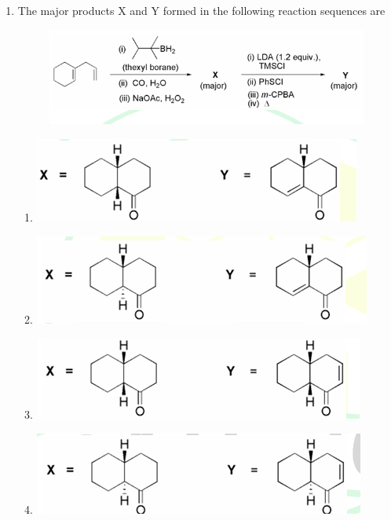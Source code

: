 \documentclass[journal,12pt,onecolumn]{IEEEtran}
\theoremstyle{remark}
\begin{document}
\begin{enumerate}
\item The major products X and Y formed in the following reaction sequences are
    \begin{figure}[H]
        \centering
        \includegraphics[width=0.4\columnwidth]{figs/q41.png}
        \caption*{}
        \label{fig:placeholder}
    \end{figure}
    \begin{enumerate}
        \item \includegraphics[width=0.6\columnwidth]{figs/q41a.png}
        \item \includegraphics[width=0.6\columnwidth]{figs/q41b.png}
        \item \includegraphics[width=0.6\columnwidth]{figs/q41c.png}
        \item \includegraphics[width=0.6\columnwidth]{figs/q41d.png}
    \end{enumerate}      \hfill{}




\end{enumerate}
\end{document}
